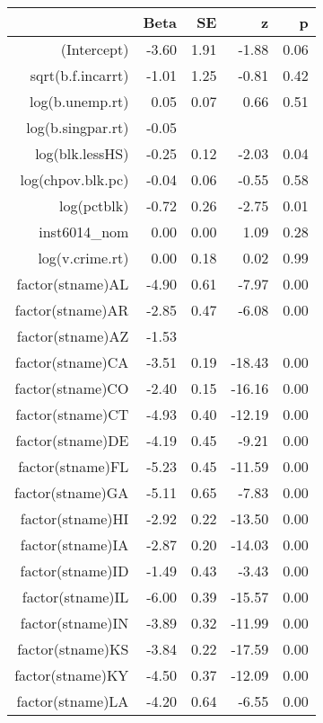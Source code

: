 \begin{table}[ht]
\centering
\begin{tabular}{rrrrr}
  \hline
 & Beta & SE & z & p \\ 
  \hline
(Intercept) & -3.60 & 1.91 & -1.88 & 0.06 \\ 
  sqrt(b.f.incarrt) & -1.01 & 1.25 & -0.81 & 0.42 \\ 
  log(b.unemp.rt) & 0.05 & 0.07 & 0.66 & 0.51 \\ 
  log(b.singpar.rt) & -0.05 &  &  &  \\ 
  log(blk.lessHS) & -0.25 & 0.12 & -2.03 & 0.04 \\ 
  log(chpov.blk.pc) & -0.04 & 0.06 & -0.55 & 0.58 \\ 
  log(pctblk) & -0.72 & 0.26 & -2.75 & 0.01 \\ 
  inst6014\_nom & 0.00 & 0.00 & 1.09 & 0.28 \\ 
  log(v.crime.rt) & 0.00 & 0.18 & 0.02 & 0.99 \\ 
  factor(stname)AL & -4.90 & 0.61 & -7.97 & 0.00 \\ 
  factor(stname)AR & -2.85 & 0.47 & -6.08 & 0.00 \\ 
  factor(stname)AZ & -1.53 &  &  &  \\ 
  factor(stname)CA & -3.51 & 0.19 & -18.43 & 0.00 \\ 
  factor(stname)CO & -2.40 & 0.15 & -16.16 & 0.00 \\ 
  factor(stname)CT & -4.93 & 0.40 & -12.19 & 0.00 \\ 
  factor(stname)DE & -4.19 & 0.45 & -9.21 & 0.00 \\ 
  factor(stname)FL & -5.23 & 0.45 & -11.59 & 0.00 \\ 
  factor(stname)GA & -5.11 & 0.65 & -7.83 & 0.00 \\ 
  factor(stname)HI & -2.92 & 0.22 & -13.50 & 0.00 \\ 
  factor(stname)IA & -2.87 & 0.20 & -14.03 & 0.00 \\ 
  factor(stname)ID & -1.49 & 0.43 & -3.43 & 0.00 \\ 
  factor(stname)IL & -6.00 & 0.39 & -15.57 & 0.00 \\ 
  factor(stname)IN & -3.89 & 0.32 & -11.99 & 0.00 \\ 
  factor(stname)KS & -3.84 & 0.22 & -17.59 & 0.00 \\ 
  factor(stname)KY & -4.50 & 0.37 & -12.09 & 0.00 \\ 
  factor(stname)LA & -4.20 & 0.64 & -6.55 & 0.00 \\ 

\end{tabular}
\end{table}
